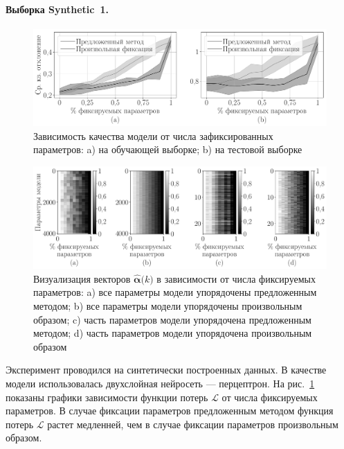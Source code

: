 \paragraph{Выборка Synthetic~1.}

\begin{figure}[h!t]\center
\includegraphics[width=1\textwidth]{results/order/generate_data_neural_loss}
\caption{Зависимость качества модели от числа зафиксированных параметров: a) на обучающей выборке; b) на тестовой выборке}
\label{fg:ex:syn3:1}
\end{figure}

\begin{figure}[h!t]\center
\includegraphics[width=1\textwidth]{results/order/generate_data_neural_matshow}
\caption{Визуализация векторов $\hat{\bm{\alpha}}\bigr(k\bigr)$ в зависимости от числа фиксируемых параметров: a) все параметры модели упорядочены предложенным методом; b) все параметры модели упорядочены произвольным образом; c) часть параметров модели упорядочена предложенным методом; d) часть параметров модели упорядочена произвольным образом}
\label{fg:ex:syn3:2}
\end{figure}

Эксперимент проводился на синтетически построенных данных. В качестве модели использовалась двухслойная нейросеть --- перцептрон.
На рис.~\ref{fg:ex:syn3:1} показаны графики зависимости функции потерь $\mathcal{L}$ от числа фиксируемых параметров. В случае фиксации параметров предложенным методом функция потерь $\mathcal{L}$ растет медленней, чем в случае фиксации параметров произвольным образом.

